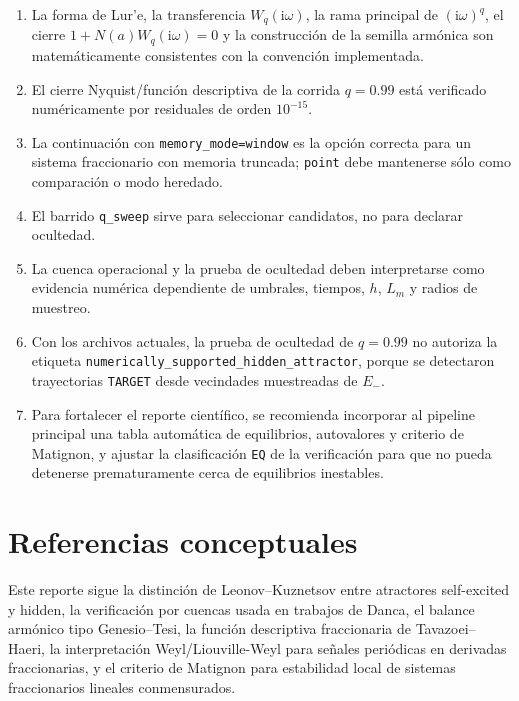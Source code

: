 \documentclass[11pt]{article}
\newcommand{\ii}{\mathrm{i}}
\begin{document}
\begin{enumerate}
\item La forma de Lur'e, la transferencia \(W_q(\ii\omega)\), la rama
principal de \((\ii\omega)^q\), el cierre \(1+N(a)W_q(\ii\omega)=0\) y la
construcción de la semilla armónica son matemáticamente consistentes con la
convención implementada.
\item El cierre Nyquist/función descriptiva de la corrida \(q=0.99\) está
verificado numéricamente por residuales de orden \(10^{-15}\).
\item La continuación con \texttt{memory\_mode=window} es la opción correcta
para un sistema fraccionario con memoria truncada; \texttt{point} debe
mantenerse sólo como comparación o modo heredado.
\item El barrido \texttt{q\_sweep} sirve para seleccionar candidatos, no para
declarar ocultedad.
\item La cuenca operacional y la prueba de ocultedad deben interpretarse como
evidencia numérica dependiente de umbrales, tiempos, \(h\), \(L_m\) y radios de
muestreo.
\item Con los archivos actuales, la prueba de ocultedad de \(q=0.99\) no
autoriza la etiqueta \texttt{numerically\_supported\_hidden\_attractor},
porque se detectaron trayectorias \texttt{TARGET} desde vecindades muestreadas
de \(E_-\).
\item Para fortalecer el reporte científico, se recomienda incorporar al
pipeline principal una tabla automática de equilibrios, autovalores y
criterio de Matignon, y ajustar la clasificación \texttt{EQ} de la verificación
para que no pueda detenerse prematuramente cerca de equilibrios inestables.
\end{enumerate}

\section*{Referencias conceptuales}

Este reporte sigue la distinción de Leonov--Kuznetsov entre atractores
self-excited y hidden, la verificación por cuencas usada en trabajos de Danca,
el balance armónico tipo Genesio--Tesi, la función descriptiva fraccionaria de
Tavazoei--Haeri, la interpretación Weyl/Liouville-Weyl para señales periódicas
en derivadas fraccionarias, y el criterio de Matignon para estabilidad local de
sistemas fraccionarios lineales conmensurados.
\end{document}
